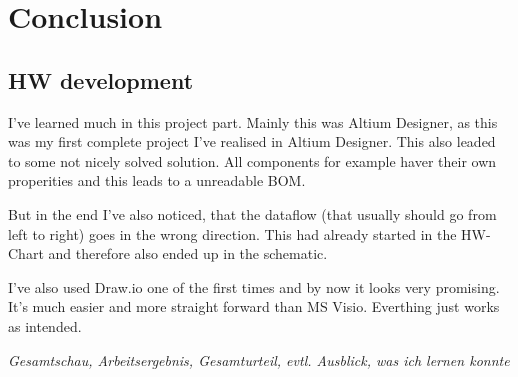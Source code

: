 \chapter{Conclusion}
\label{cha:Conclusion}

\section{HW development}
I've learned much in this project part. Mainly this was Altium Designer, as this was my first complete project I've realised in Altium Designer. This also leaded to some not nicely solved solution. All components for example haver their own properities and this leads to a unreadable BOM.

But in the end I've also noticed, that the dataflow (that usually should go from left to right) goes in the wrong direction. This had already started in the HW-Chart and therefore also ended up in the schematic.

I've also used Draw.io one of the first times and by now it looks very promising. It's much easier and more straight forward than MS Visio. Everthing just works as intended.



\textit{Gesamtschau, Arbeitsergebnis, Gesamturteil, evtl. Ausblick, was ich lernen konnte}